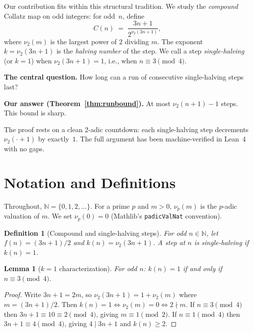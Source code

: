 \documentclass[12pt]{article}
\newtheorem{lemma}[theorem]{Lemma}
\newtheorem{definition}[theorem]{Definition}
\newcommand{\vp}{\nu_2}
\begin{document}
Our contribution fits within this structural tradition.  We study the
\emph{compound} Collatz map on odd integers: for odd~$n$, define
\[
  C(n) \;=\; \frac{3n+1}{2^{\vp(3n+1)}},
\]
where $\vp(m)$ is the largest power of $2$ dividing $m$.  The exponent
$k = \vp(3n+1)$ is the \emph{halving number} of the step.  We call a
step \emph{single-halving} (or $k=1$) when $\vp(3n+1) = 1$, i.e., when
$n \equiv 3 \pmod{4}$.

\textbf{The central question.}  How long can a run of consecutive
single-halving steps last?

\textbf{Our answer (Theorem~\ref{thm:runbound}).}  At most
$\vp(n+1)-1$ steps.  This bound is sharp.

The proof rests on a clean 2-adic countdown: each single-halving step
decrements $\vp(\cdot+1)$ by exactly~$1$.  The full argument has been
machine-verified in Lean~4 with no gaps.

\section{Notation and Definitions}

Throughout, $\mathbb{N} = \{0,1,2,\ldots\}$.  For a prime $p$ and $m>0$,
$\nu_p(m)$ is the $p$-adic valuation of $m$.  We set $\nu_p(0)=0$
(Mathlib's \texttt{padicValNat} convention).

\begin{definition}[Compound and single-halving steps]\label{def:step}
For odd $n \in \mathbb{N}$, let $f(n) = (3n+1)/2$ and
$k(n) = \vp(3n+1)$.  A step at $n$ is \emph{single-halving} if $k(n)=1$.
\end{definition}

\begin{lemma}[$k=1$ characterization]\label{lem:k1char}
For odd $n$: $k(n) = 1$ if and only if $n \equiv 3 \pmod{4}$.
\end{lemma}

\begin{proof}
Write $3n+1 = 2m$, so $\vp(3n+1) = 1 + \vp(m)$ where $m=(3n+1)/2$.
Then $k(n)=1 \Leftrightarrow \vp(m)=0 \Leftrightarrow 2\nmid m$.
If $n\equiv 3\pmod 4$ then $3n+1 \equiv 10 \equiv 2 \pmod 4$, giving
$m \equiv 1\pmod 2$.
If $n\equiv 1\pmod 4$ then $3n+1 \equiv 4\pmod 4$, giving $4\mid 3n+1$
and $k(n)\geq 2$.
\end{proof}

\end{document}
